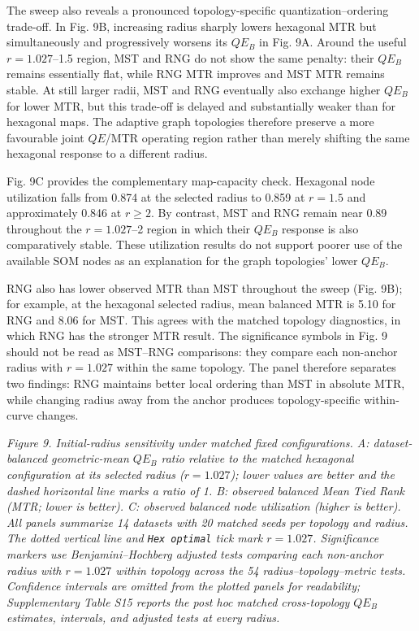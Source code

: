 \documentclass[
]{article}
\makeatletter
\newcommand*\pandocbounded[1]{%
  \sbox\pandoc@box{#1}%
  \Gscale@div\@tempa{\textheight}{\dimexpr\ht\pandoc@box+\dp\pandoc@box\relax}%
  \Gscale@div\@tempb{\linewidth}{\wd\pandoc@box}%
  \ifdim\@tempb\p@<\@tempa\p@\let\@tempa\@tempb\fi%
  \ifdim\@tempa\p@<\p@\scalebox{\@tempa}{\usebox\pandoc@box}%
  \else\usebox{\pandoc@box}%
  \fi%
}
\providecommand{\DIFadd}[1]{{\protect\color{blue} #1}} %
\makeatother
\begin{document}
\DIFadd{The sweep also reveals a pronounced topology-specific
quantization--ordering trade-off. In Fig. 9B, increasing radius sharply
lowers hexagonal MTR but simultaneously and progressively worsens its
\(QE_B\) in Fig. 9A. Around the useful \(r=1.027\)--1.5 region, MST and
RNG do not show the same penalty: their \(QE_B\) remains essentially
flat, while RNG MTR improves and MST MTR remains stable. At still larger
radii, MST and RNG eventually also exchange higher \(QE_B\) for lower
MTR, but this trade-off is delayed and substantially weaker than for
hexagonal maps. The adaptive graph topologies therefore preserve a more
favourable joint \(QE\)/MTR operating region rather than merely shifting
the same hexagonal response to a different radius.
}

\DIFadd{Fig. 9C provides the complementary map-capacity check. Hexagonal node
utilization falls from 0.874 at the selected radius to 0.859 at
\(r=1.5\) and approximately 0.846 at \(r\geq2\). By contrast, MST and
RNG remain near 0.89 throughout the \(r=1.027\)--2 region in which their
\(QE_B\) response is also comparatively stable. These utilization
results do not support poorer use of the available SOM nodes as an
explanation for the graph topologies' lower \(QE_B\).
}

\DIFadd{RNG also has lower observed MTR than MST throughout the sweep (Fig. 9B);
for example, at the hexagonal selected radius, mean balanced MTR is 5.10
for RNG and 8.06 for MST. This agrees with the matched topology
diagnostics, in which RNG has the stronger MTR result. The significance
symbols in Fig. 9 should not be read as MST--RNG comparisons: they
compare each non-anchor radius with \(r=1.027\) within the same
topology. The panel therefore separates two findings: RNG maintains
better local ordering than MST in absolute MTR, while changing radius
away from the anchor produces topology-specific within-curve changes.
}

\pandocbounded{}
\DIFadd{\emph{Figure 9. Initial-radius sensitivity under matched fixed
configurations. A: dataset-balanced geometric-mean \(QE_B\) ratio
relative to the matched hexagonal configuration at its selected radius
(\(r=1.027\)); lower values are better and the dashed horizontal line
marks a ratio of 1. B: observed balanced Mean Tied Rank (MTR; lower is
better). C: observed balanced node utilization (higher is better). All
panels summarize 14 datasets with 20 matched seeds per topology and
radius. The dotted vertical line and \texttt{Hex\ optimal} tick mark
\(r=1.027\). Significance markers use Benjamini--Hochberg adjusted tests
comparing each non-anchor radius with \(r=1.027\) within topology across
the 54 radius--topology--metric tests. Confidence intervals are omitted
from the plotted panels for readability; Supplementary Table S15 reports
the post hoc matched cross-topology \(QE_B\) estimates, intervals, and
adjusted tests at every radius.}
}
\end{document}
